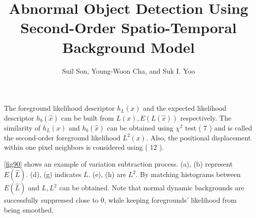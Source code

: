 \documentclass[a4paper,twocolumn, 10pt]{article}
\author{Suil Son, Young-Woon Cha, and Suk I. Yoo}
\title{Abnormal Object Detection Using Second-Order Spatio-Temporal Background Model}
\begin{document}

The foreground likelihood descriptor \begin{math} h_L(x) \end{math} and the expected likelihood descriptor
\begin{math} h_b(\hat{x}) \end{math} can be built from \begin{math} L(x), E(L(\hat{x})) \end{math} respectively.
The similarity of \begin{math} h_L(x) \end{math}  and \begin{math} h_b(\hat{x}) \end{math} can be obtained using 
\begin{math} \chi ^2 \end{math} test ( 7 ) and is called the second-order foreground likelihood \begin{math} L^2(x) \end{math}.
Also, the positional displacement within one pixel neighbors is considered using ( 12 ).

\ref{fig90} shows an example of variation subtraction process. (a), (b) represent \begin{math} E(\hat{L}) \end{math}.
(d), (g) indicates \begin{math} L \end{math}. (e), (h) are \begin{math} L^2 \end{math}.
By matching histograms between \begin{math} E(\hat{L}) \end{math} and \begin{math} L, L^2 \end{math} can be obtained.
Note that normal dynamic backgrounds are successfully suppressed close to 0, while keeping foregrounds' likelihood from being smoothed.

\end{document}
